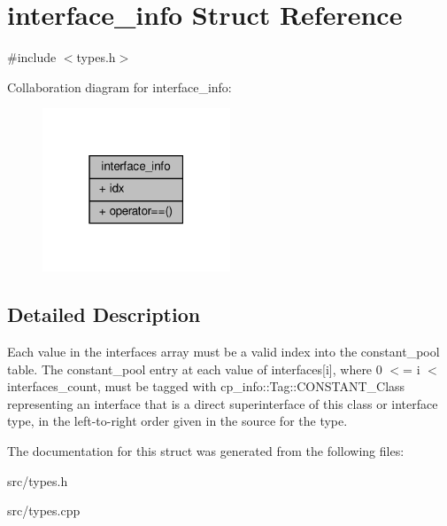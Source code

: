 \hypertarget{structinterface__info}{}\section{interface\+\_\+info Struct Reference}
\label{structinterface__info}


{\ttfamily \#include $<$types.\+h$>$}



Collaboration diagram for interface\+\_\+info\+:
\nopagebreak
\begin{figure}[H]
\begin{center}
\leavevmode
\includegraphics[width=159pt]{structinterface__info__coll__graph}
\end{center}
\end{figure}


\subsection{Detailed Description}
Each value in the interfaces array must be a valid index into the constant\+\_\+pool table. The constant\+\_\+pool entry at each value of interfaces\mbox{[}i\mbox{]}, where 0 $<$= i $<$ interfaces\+\_\+count, must be tagged with cp\+\_\+info\+::\+Tag\+::\+C\+O\+N\+S\+T\+A\+N\+T\+\_\+\+Class representing an interface that is a direct superinterface of this class or interface type, in the left-\/to-\/right order given in the source for the type. 

The documentation for this struct was generated from the following files\+:\begin{DoxyCompactItemize}
\item 
src/types.\+h\item 
src/types.\+cpp\end{DoxyCompactItemize}

